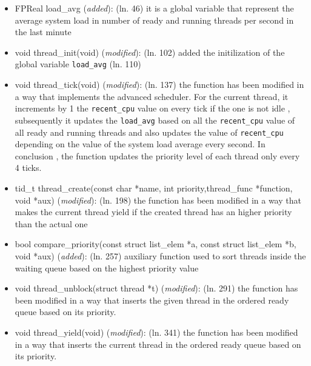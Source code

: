 \documentclass[11pt]{scrartcl}
\begin{document}
\begin{itemize} 
    \item FPReal load\_avg  (\textit{added}): \newline
    (ln. 46) it is a global variable that represent the average system load in number of ready and running threads per second in the last minute
	\item void thread\_init(void) (\textit{modified}): \newline
	(ln. 102) added the initilization of the global variable \texttt{load\_avg} (ln. 110)
	\item void thread\_tick(void) (\textit{modified}): \newline
	(ln. 137) the function has been modified in a way that implements the advanced scheduler. For the current thread, 
	it increments by 1 the \texttt{recent\_cpu} value on every tick if the one is not idle , subsequently it updates the \texttt{load\_avg} based on all the \texttt{recent\_cpu} value of all ready and running threads and also updates the value of \texttt{recent\_cpu} 
	depending on the value of the system load average every second. In conclusion , the function updates the priority level of each thread only every 4 ticks.   

	\item tid\_t thread\_create(const char *name, int priority,thread\_func *function, void *aux) (\textit{modified}): \newline %
	(ln. 198) the function has been modified in a way that makes the current thread yield if the created thread has an higher priority than the actual one 
	\item bool compare\_priority(const struct list\_elem *a, const struct list\_elem *b, void *aux) (\textit{added}): \newline 
	(ln. 257) auxiliary function used to sort threads inside the waiting queue based on the highest priority value
	
	\item void thread\_unblock(struct thread *t) (\textit{modified}): \newline 
	(ln. 291) the function has been modified in a way that inserts the given thread in the ordered ready queue based on its priority. 
	\item void thread\_yield(void) (\textit{modified}): \newline 
	(ln. 341) the function has been modified in a way that inserts the current thread in the ordered ready queue based on its priority. 
	

\end{itemize}
\end{document}
